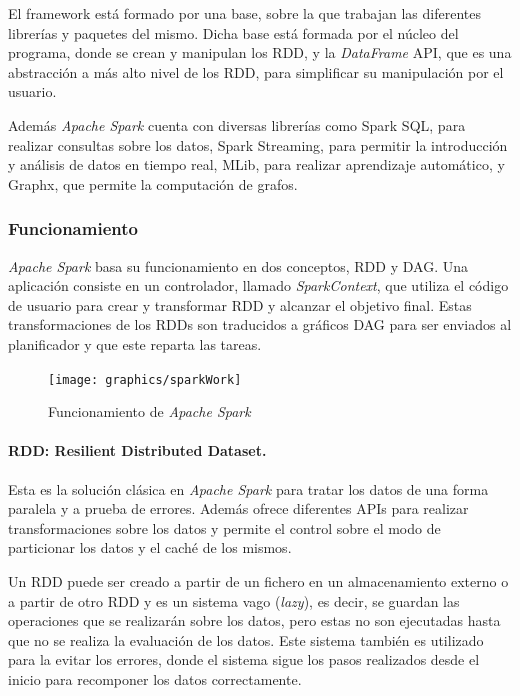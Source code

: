 El \gls{framework} está formado por una base, sobre la que trabajan las diferentes librerías y paquetes del mismo. Dicha base está formada por el núcleo del programa, donde se crean y manipulan los \gls{RDD}, y la \textit{DataFrame} \gls{API}, que es una abstracción a más alto nivel de los \gls{RDD}, para simplificar su manipulación por el usuario.

Además \textit{Apache Spark} cuenta con diversas librerías como Spark SQL, para realizar consultas sobre los datos, Spark Streaming, para permitir la introducción y análisis de datos en tiempo real, MLib, para realizar aprendizaje automático, y Graphx, que permite la computación de grafos.

\subsubsection{Funcionamiento}
\textit{Apache Spark} basa su funcionamiento en dos conceptos, \gls{RDD} y \gls{DAG}. Una aplicación consiste en un controlador, llamado \textit{SparkContext}, que utiliza el código de usuario para crear y transformar \gls{RDD} y alcanzar el objetivo final. Estas transformaciones de los \gls{RDD}s son traducidos a gráficos \gls{DAG} para ser enviados al planificador y que este reparta las tareas.

\begin{figure}[htp!]
	\centering
	\caption{Funcionamiento de \textit{Apache Spark} \cite{partsSpark}}
	\label{sparkWork}
	\vspace{5pt}
	\texttt{[image: graphics/sparkWork]}
\end{figure}

\paragraph{\gls{RDD}: Resilient Distributed Dataset.}
Esta es la solución clásica en \textit{Apache Spark} para tratar los datos de una forma paralela y a prueba de errores. Además ofrece diferentes \gls{API}s para realizar transformaciones sobre los datos y permite el control sobre el modo de particionar los datos y el caché de los mismos.

Un \gls{RDD} puede ser creado a partir de un fichero en un almacenamiento externo o a partir de otro \gls{RDD} y es un sistema vago (\textit{lazy}), es decir, se guardan las operaciones que se realizarán sobre los datos, pero estas no son ejecutadas hasta que no se realiza la evaluación de los datos. Este sistema también es utilizado para la evitar los errores, donde el sistema sigue los pasos realizados desde el inicio para recomponer los datos correctamente.


